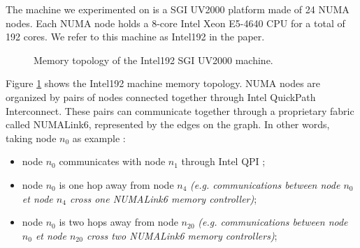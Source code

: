 \documentclass{Styles/llncs}
\begin{document}
The machine we experimented on is a SGI UV2000 platform made of 24 NUMA nodes.
Each NUMA node holds a 8-core Intel Xeon E5-4640 CPU for a total of 192 cores.
We refer to this machine as Intel192 in the paper. 

\begin{figure}
\begin{center}
\end{center}
\caption{Memory topology of the Intel192 SGI UV2000 machine.}
\label{fig:idchire}
\end{figure}

Figure \ref{fig:idchire} shows the Intel192 machine memory topology.
NUMA nodes are organized by pairs of nodes connected together through Intel QuickPath Interconnect.
These pairs can communicate together through a proprietary fabric called NUMALink6, represented by the edges on the graph.
In other words, taking node $n_0$ as example :
\begin{itemize}
\item node $n_0$ communicates with node $n_1$ through Intel QPI ;
\item node $n_0$ is one hop away from node $n_4$ \emph{(e.g. communications between node $n_0$ et node $n_4$ cross one NUMALink6 memory controller)};
\item node $n_0$ is two hops away from node $n_{20}$ \emph{(e.g. communications between node $n_0$ et node $n_{20}$ cross two NUMALink6 memory controllers)};
\end{itemize}
\end{document}
